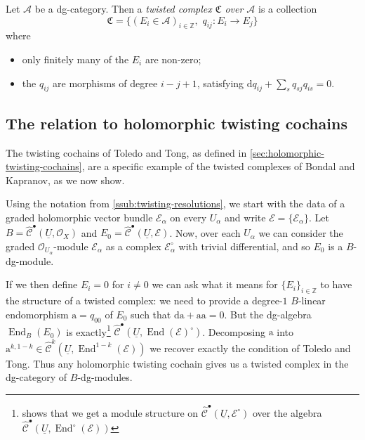 \documentclass[11pt,notitlepage]{article}
\numberwithin{equation}{subsection}
\DeclareMathOperator{\End}{End}
\renewcommand{\d}{\mathrm{d}}
\renewcommand{\C}{\mathscr{C}}
\begin{document}
                \begin{definition}
                    Let $\mathcal{A}$ be a dg-category.
                    Then a \emph{twisted complex $\mathfrak{C}$ over $\mathcal{A}$} is a collection
                    \[
                        \mathfrak{C} = \{(E_i\in\mathcal{A})_{i\in\mathbb{Z}},\,\, q_{ij}\colon E_i\to E_j\}
                    \]
                    where
                    \begin{itemize}
                        \item only finitely many of the $E_i$ are non-zero;
                        \item the $q_{ij}$ are morphisms of degree $i-j+1$, satisfying $\d q_{ij}+\sum_s q_{sj}q_{is}=0$.\qedhere
                    \end{itemize}
                \end{definition}

            \subsection{The relation to holomorphic twisting cochains}

                The twisting cochains of Toledo and Tong, as defined in \cref{sec:holomorphic-twisting-cochains}, are a specific example of the twisted complexes of Bondal and Kapranov, as we now show.

                Using the notation from \cref{ssub:twisting-resolutions}, we start with the data of a graded holomorphic vector bundle $\mathcal{E}_\alpha$ on every $U_\alpha$ and write $\mathcal{E}=\{\mathcal{E}_\alpha\}$.
                Let $B=\hat{\C}^\bullet(\underline{U},\mathcal{O}_X)$ and $E_0=\hat{\C}^\bullet(\underline{U},\mathcal{E})$.
                Now, over each $U_\alpha$ we can consider the graded $\mathcal{O}_{U_\alpha}$-module $\mathcal{E}_\alpha$ as a complex $\mathcal{E}_\alpha^\circ$ with trivial differential, and so $E_0$ is a $B$-dg-module.

                If we then define $E_i=0$ for $i\neq0$ we can ask what it means for $\{E_i\}_{i\in\mathbb{Z}}$ to have the structure of a twisted complex: we need to provide a degree-$1$ $B$-linear endomorphism $\mathrm{a}=q_{00}$ of $E_0$ such that $\d\mathrm{a}+\mathrm{a}\mathrm{a}=0$.
                But the dg-algebra $\End_B(E_0)$ is exactly\footnote{\cite[§1]{OBrian:1981vs} shows that we get a module structure on $\hat{\C}^\bullet(\underline{U},\mathcal{E}^\circ)$ over the algebra $\hat{\C}^\bullet(\underline{U},\End^\circ(\mathcal{E}))$} $\hat{\C}^\bullet(\underline{U},\End(\mathcal{E})^\circ)$.
                Decomposing $\mathrm{a}$ into $\mathrm{a}^{k,1-k}\in\hat{\C}^k(\underline{U},\End^{1-k}(\mathcal{E}))$ we recover exactly the condition of Toledo and Tong.
                Thus any holomorphic twisting cochain gives us a twisted complex in the dg-category of $B$-dg-modules.
\end{document}
